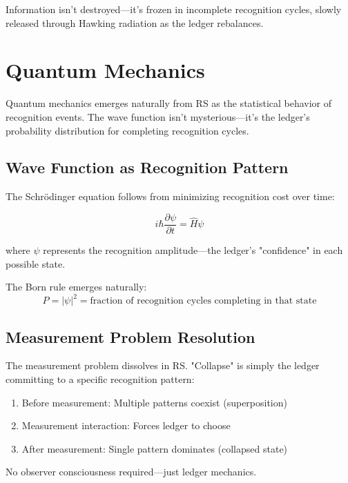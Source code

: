 \documentclass[12pt,a4paper]{article}
\theoremstyle{definition}
\begin{document}
Information isn't destroyed—it's frozen in incomplete recognition cycles, slowly released through Hawking radiation as the ledger rebalances.

\section{Quantum Mechanics}

Quantum mechanics emerges naturally from RS as the statistical behavior of recognition events. The wave function isn't mysterious—it's the ledger's probability distribution for completing recognition cycles.

\subsection{Wave Function as Recognition Pattern}

The Schrödinger equation follows from minimizing recognition cost over time:

\begin{equation}
    i\hbar\frac{\partial\psi}{\partial t} = \hat{H}\psi
\end{equation}

where $\psi$ represents the recognition amplitude—the ledger's "confidence" in each possible state.

The Born rule emerges naturally:
\begin{equation}
    P = |\psi|^2 = \text{fraction of recognition cycles completing in that state}
\end{equation}

\subsection{Measurement Problem Resolution}

The measurement problem dissolves in RS. "Collapse" is simply the ledger committing to a specific recognition pattern:

\begin{enumerate}
    \item Before measurement: Multiple patterns coexist (superposition)
    \item Measurement interaction: Forces ledger to choose
    \item After measurement: Single pattern dominates (collapsed state)
\end{enumerate}

No observer consciousness required—just ledger mechanics.
\end{document}
